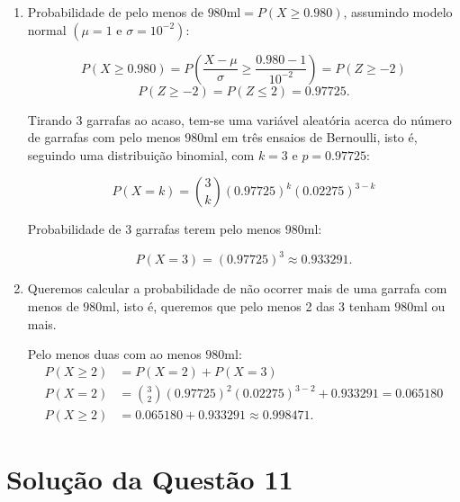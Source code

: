 \documentclass[
	12pt,				%
	openright,			%
	oneside,			%
	a4paper,			%
	english,			%
	brazil,				%
	]{abntex2}
\begin{document}
\begin{enumerate}[label=\alph*)]
    \item Probabilidade de pelo menos de $980 \text{ml} = P(X \geq 0.980)$, assumindo modelo normal $(\mu = 1 \text{ e } \sigma = 10^{-2})$:
    
    $$P(X \geq 0.980) = P\left(\frac{X - \mu}{\sigma} \geq \frac{0.980 - 1}{10^{-2}}\right) = P(Z \geq -2)$$
    $$P(Z \geq -2) = P(Z \leq 2) = 0.97725.$$
    
    Tirando 3 garrafas ao acaso, tem-se uma variável aleatória acerca do número de garrafas com pelo menos $980$ml em três ensaios de Bernoulli, isto é, seguindo uma distribuição binomial, com $k = 3$ e $p = 0.97725$:
    
    $$P(X = k) = \binom{3}{k}(0.97725)^{k}(0.02275)^{3-k}$$
    
    Probabilidade de 3 garrafas terem pelo menos $980$ml:
    
    $$P(X = 3) = (0.97725)^3 \approx 0.933291.$$
    
    \item Queremos calcular a probabilidade de não ocorrer mais de uma garrafa com menos de $980$ml, isto é, queremos que pelo menos 2 das 3 tenham $980$ml ou mais. 
    
    Pelo menos duas com ao menos $980$ml:
    \begin{align*}
        P(X \geq 2) &= P(X = 2) + P(X = 3)\\
        P(X = 2) &= \binom{3}{2}(0.97725)^{2}(0.02275)^{3-2} + 0.933291 =  0.065180\\
        P(X \geq 2) &= 0.065180 + 0.933291 \approx 0.998471.
    \end{align*}
    
\end{enumerate}

\section{Solução da Questão 11}
\end{document}
